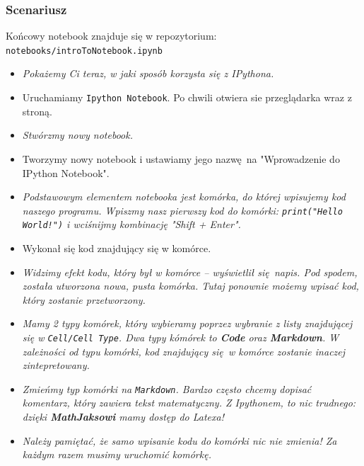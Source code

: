 \documentclass{mwart}
\begin{document}
\subsubsection{Scenariusz}
Końcowy notebook znajduje się w repozytorium: \texttt{notebooks/introToNotebook.ipynb}
\begin{itemize}
  \item \emph{Pokażemy Ci teraz, w jaki sposób korzysta się z IPythona.}
  \item Uruchamiamy \texttt{Ipython Notebook}. Po chwili otwiera sie przeglądarka wraz z
    stroną.
  \item \emph{Stwórzmy nowy notebook.}
  \item Tworzymy nowy notebook i ustawiamy jego nazwę na "Wprowadzenie do IPython
    Notebook".
  \item \emph{Podstawowym elementem notebooka jest komórka, do której
      wpisujemy kod naszego programu. Wpiszmy nasz pierwszy kod do komórki:
    \texttt{print("Hello World!")} i wciśnijmy kombinację "Shift + Enter".}
  \item Wykonał się kod znajdujący się w komórce.
  \item \emph{Widzimy efekt kodu, który był w komórce -- wyświetlił się napis. Pod spodem, została utworzona nowa,
      pusta komórka. Tutaj ponownie możemy wpisać kod, który zostanie przetworzony.}
  \item \emph{Mamy 2 typy komórek, który wybieramy poprzez wybranie z listy znajdującej się w
      \texttt{Cell/Cell Type}. Dwa typy kómórek to \textbf{Code} oraz \textbf{Markdown}. W
    zależności od typu komórki, kod znajdujący się w komórce zostanie inaczej
    zintepretowany.}
\item \emph{Zmieńmy typ komórki na \texttt{Markdown}. Bardzo często chcemy dopisać
    komentarz, który zawiera tekst matematyczny. Z Ipythonem, to nic trudnego: dzięki
    \textbf{MathJaksowi} mamy dostęp do Latexa!}
\item \emph{Należy pamiętać, że samo wpisanie kodu do komórki nic nie zmienia! Za każdym
    razem musimy uruchomić komórkę.}

\end{itemize}
\end{document}
